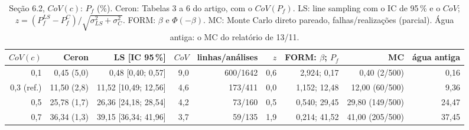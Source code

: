 \begin{table}[htbp]\centering\scriptsize\setlength{\tabcolsep}{3pt}
\caption{Seção 6.2, $CoV(c)$: $P_f$ (\%). Ceron: Tabelas 3 a 6 do artigo, com o $CoV(P_f)$. LS: line sampling com o IC de 95\,\% e o $CoV$; $z = (P_f^{LS} - P_f^{C})/\sqrt{\sigma_{LS}^2 + \sigma_C^2}$. FORM: $\beta$ e $\Phi(-\beta)$. MC: Monte Carlo direto pareado, falhas/realizações (parcial). Água antiga: o MC do relatório de 13/11.}\label{tab:pf_covc}
\begin{tabular}{rrrrrrrrr}\toprule
$CoV(c)$ & Ceron & LS [IC 95\,\%] & $CoV$ & linhas/análises & $z$ & FORM: $\beta$; $P_f$ & MC & água antiga \\\midrule
0{,}1 & 0{,}45 (5{,}0) & 0{,}48 [0{,}40; 0{,}57] & 9{,}0 & 600/1642 & 0{,}6 & 2{,}924; 0{,}17 & 0{,}40 (2/500) & 0{,}16 \\
0{,}3 (ref.) & 11{,}50 (2{,}8) & 11{,}52 [10{,}49; 12{,}56] & 4{,}6 & 173/411 & 0{,}0 & 1{,}152; 12{,}48 & 12{,}00 (60/500) & 9{,}36 \\
0{,}5 & 25{,}78 (1{,}7) & 26{,}36 [24{,}18; 28{,}54] & 4{,}2 & 73/160 & 0{,}5 & 0{,}540; 29{,}45 & 29{,}80 (149/500) & 24{,}47 \\
0{,}7 & 36{,}34 (1{,}3) & 39{,}15 [36{,}34; 41{,}96] & 3{,}7 & 59/135 & 1{,}9 & 0{,}214; 41{,}52 & 41{,}00 (205/500) & 37{,}45 \\
\bottomrule\end{tabular}\end{table}
